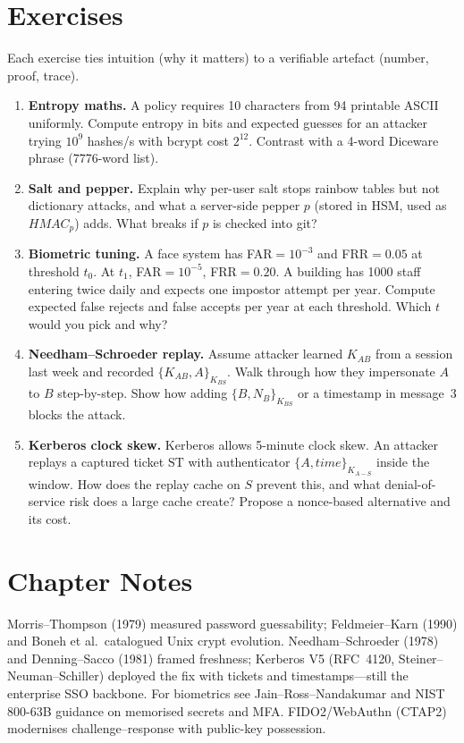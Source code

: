 \section{Exercises}
\label{sec:auth-exercises}
Each exercise ties intuition (why it matters) to a verifiable artefact (number, proof, trace).
\begin{enumerate}[label=E3.\arabic*, leftmargin=*, itemsep=0.6em]
    \item \textbf{Entropy maths.} A policy requires 10 characters from 94 printable ASCII uniformly. Compute entropy in bits and expected guesses for an attacker trying $10^9$ hashes/s with bcrypt cost $2^{12}$. Contrast with a 4-word Diceware phrase (7776-word list).
    \item \textbf{Salt and pepper.} Explain why per-user salt stops rainbow tables but not dictionary attacks, and what a server-side pepper $p$ (stored in HSM, used as $HMAC_p$) adds. What breaks if $p$ is checked into git?
    \item \textbf{Biometric tuning.} A face system has FAR$=10^{-3}$ and FRR$=0.05$ at threshold $t_0$. At $t_1$, FAR$=10^{-5}$, FRR$=0.20$. A building has 1000 staff entering twice daily and expects one impostor attempt per year. Compute expected false rejects and false accepts per year at each threshold. Which $t$ would you pick and why?
    \item \textbf{Needham--Schroeder replay.} Assume attacker learned $K_{AB}$ from a session last week and recorded $\{K_{AB},A\}_{K_{BS}}$. Walk through how they impersonate $A$ to $B$ step-by-step. Show how adding $\{B,N_B\}_{K_{BS}}$ or a timestamp in message~3 blocks the attack.
    \item \textbf{Kerberos clock skew.} Kerberos allows 5-minute clock skew. An attacker replays a captured ticket
    $\text{ST}$ with authenticator $\{A,time\}_{K_{A\!-\!S}}$ inside the window. How does the replay cache on $S$ prevent this, and what denial-of-service risk does a large cache create? Propose a nonce-based alternative and its cost.
\end{enumerate}

\section*{Chapter Notes}
Morris--Thompson (1979) measured password guessability; Feldmeier--Karn (1990) and Boneh et al.\ catalogued Unix crypt evolution. Needham--Schroeder (1978) and Denning--Sacco (1981) framed freshness; Kerberos V5 (RFC~4120, Steiner--Neuman--Schiller) deployed the fix with tickets and timestamps---still the enterprise SSO backbone. For biometrics see Jain--Ross--Nandakumar and NIST 800-63B guidance on memorised secrets and MFA. FIDO2/WebAuthn (CTAP2) modernises challenge--response with public-key possession.


